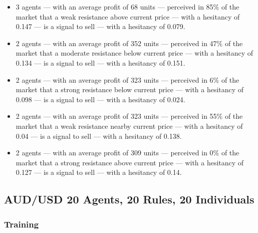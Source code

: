 {\scriptsize
  \begin{itemize}
  \item 3 agents — with an average profit of 68 units — perceived in 85\% of the
    market that a weak resistance above current price — with a hesitancy of
    0.147 — is a signal to sell — with a hesitancy of 0.079.
  \item 2 agents — with an average profit of 352 units — perceived in 47\% of
    the market that a moderate resistance below current price — with a hesitancy
    of 0.134 — is a signal to sell — with a hesitancy of 0.151.
  \item 2 agents — with an average profit of 323 units — perceived in 6\% of the
    market that a strong resistance below current price — with a hesitancy of
    0.098 — is a signal to sell — with a hesitancy of 0.024.
  \item 2 agents — with an average profit of 323 units — perceived in 55\% of
    the market that a weak resistance nearby current price — with a hesitancy of
    0.04 — is a signal to sell — with a hesitancy of 0.138.
  \item 2 agents — with an average profit of 309 units — perceived in 0\% of the
    market that a strong resistance above current price — with a hesitancy of
    0.127 — is a signal to sell — with a hesitancy of 0.14.
  \end{itemize}
}



\subsection{AUD/USD 20 Agents, 20 Rules, 20 Individuals}
\label{}

\subsubsection{Training}
\label{}

